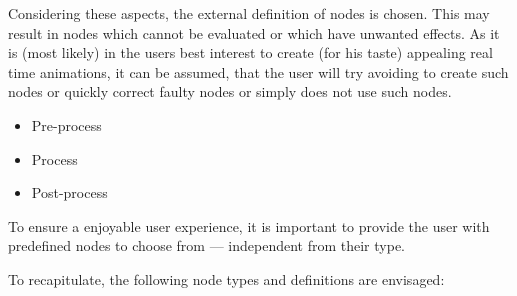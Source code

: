 \documentclass[10pt, openright, notitlepage]{scrreprt}
\begin{document}
Considering these aspects, the external definition of nodes is chosen. This may
result in nodes which cannot be evaluated or which have unwanted effects. As it
is (most likely) in the users best interest to create (for his taste) appealing
real time animations, it can be assumed, that the user will try avoiding to
create such nodes or quickly correct faulty nodes or simply does not use such nodes.

\begin{itemize}
\item Pre-process
\item Process
\item Post-process
\end{itemize}

To ensure a enjoyable user experience, it is important to provide the user with
predefined nodes to choose from --- independent from their type.

To recapitulate, the following node types and definitions are envisaged:
\end{document}
